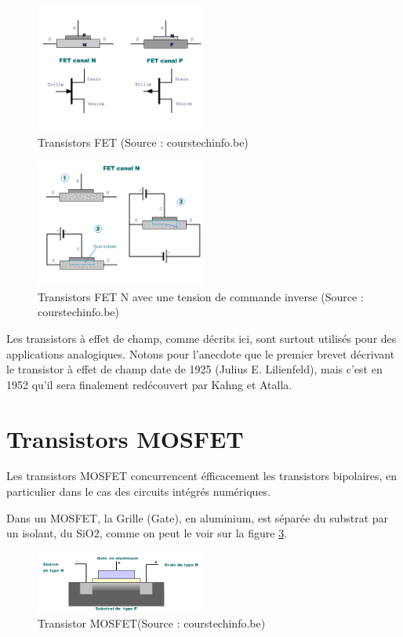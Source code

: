 \documentclass[a4paper,11pt]{book}
\theoremstyle{definition}
\begin{document}
\begin{figure}
\centering
\includegraphics[width=0.5\textwidth]{media/Semicon/FET_N_et_P.png}
\caption{Transistors FET (Source : courstechinfo.be)}
\label{fig:FET}
\end{figure}

\begin{figure}
\centering
\includegraphics[width=0.5\textwidth]{media/Semicon/FET_N.png}
\caption{Transistors FET N avec une tension de commande inverse (Source : courstechinfo.be)}
\label{fig:FET_N}
\end{figure}

Les transistors à effet de champ, comme décrits ici, sont surtout utilisés pour des applications analogiques. Notons pour l'anecdote que le premier brevet décrivant le transistor à effet de champ date de 1925 (Julius E. Lilienfeld), mais c'est en 1952 qu'il sera finalement redécouvert par Kahng et Atalla.

\section{Transistors MOSFET}
Les transistors MOSFET concurrencent éfficacement les transistors bipolaires, en particulier dans le cas des circuits intégrés numériques.

Dans un MOSFET, la Grille (Gate), en aluminium, est séparée du substrat par un isolant, du SiO2, comme on peut le voir sur la figure \ref{fig:MOSFET}.

\begin{figure}
\centering
\includegraphics[width=0.5\textwidth]{media/Semicon/MOSFET.png}
\caption{Transistor MOSFET(Source : courstechinfo.be)}
\label{fig:MOSFET}
\end{figure}
\end{document}
